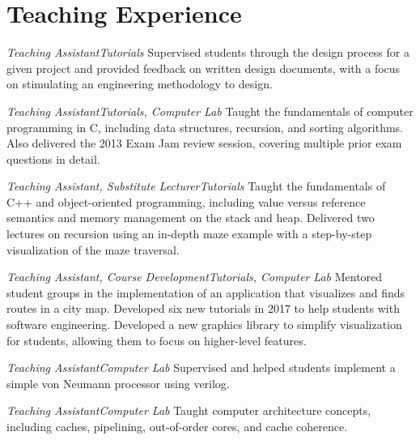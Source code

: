 \section{\sc Teaching Experience}

{\textit{Teaching Assistant}}{\textit{Tutorials}}
{
  Supervised students through the design process for a given project and provided feedback on written design documents, with a focus on stimulating an engineering methodology to design.
}

{\textit{Teaching Assistant}}{\textit{Tutorials, Computer Lab}}
{
  Taught the fundamentals of computer programming in C, including data structures, recursion, and sorting algorithms.
  Also delivered the 2013 Exam Jam review session, covering multiple prior exam questions in detail.
}

{\textit{Teaching Assistant, Substitute Lecturer}}{\textit{Tutorials}}
{
  Taught the fundamentals of C++ and object-oriented programming, including value versus reference semantics and memory management on the stack and heap.
  Delivered two lectures on recursion using an in-depth maze example with a step-by-step visualization of the maze traversal.
}

{\textit{Teaching Assistant, Course Development}}{\textit{Tutorials, Computer Lab}}
{
  Mentored student groups in the implementation of an application that visualizes and finds routes in a city map.
  Developed six new tutorials in 2017 to help students with software engineering.
  Developed a new graphics library to simplify visualization for students, allowing them to focus on higher-level features.
}

{\textit{Teaching Assistant}}{\textit{Computer Lab}}
{
  Supervised and helped students implement a simple von Neumann processor using verilog.
}

{\textit{Teaching Assistant}}{\textit{Computer Lab}}
{
  Taught computer architecture concepts, including caches, pipelining, out-of-order cores, and cache coherence.
}
